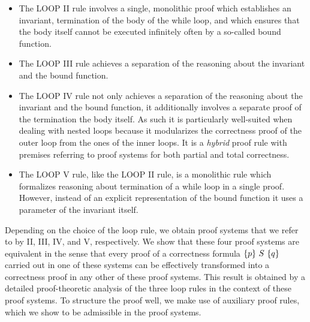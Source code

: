 \documentclass[runningheads]{llncs}       %
\begin{document}
\begin{itemize}

\item 
The LOOP II rule involves a single, monolithic proof which establishes an invariant, termination of the body of the \rm{while} loop,
and which ensures that the body itself cannot be executed infinitely often
by a so-called bound function.

\item The LOOP III rule achieves a separation of the reasoning about
  the invariant and the bound function.

\item
The LOOP IV rule not only achieves a separation of the reasoning about
the invariant and the bound function, it additionally involves
a separate proof of the termination the body itself.
As such it is particularly well-suited when dealing with nested loops
because it modularizes the correctness proof of the outer loop from
the ones of the inner loops. It is a \emph{hybrid} proof rule with
premises referring to proof systems for both partial and total correctness.

\item The LOOP V rule, like the LOOP II rule, is a monolithic rule
which formalizes reasoning  about termination of a \rm{while} loop in a single proof.
However, instead  of an explicit representation of the bound function
it uses  a parameter of the invariant itself.

\end{itemize}

Depending on the choice of the loop rule, we obtain proof systems that
we refer to by II, III, IV, and V, respectively.  We show that these
four proof systems are equivalent in the sense that every proof of a
correctness formula $\mbox{$\{{p}\}\ {S}\ \{{q}\}$}$ carried out in one of these systems
can be effectively transformed into a correctness proof in any other
of these proof systems.  This result is obtained by a detailed
proof-theoretic analysis of the three loop rules in the context of
these proof systems. To structure the proof well, we make use of
auxiliary proof rules, which we show to be admissible in the proof systems.
\end{document}
